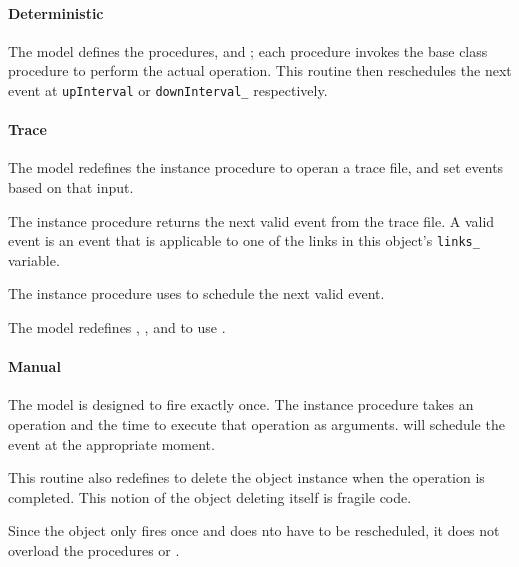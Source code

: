 \paragraph{Deterministic}
The model defines the procedures,  and ;
each procedure invokes the base class procedure to perform the actual operation.
This routine then reschedules the next event at
{\tt upInterval} or {\tt downInterval\_} respectively.

\paragraph{Trace}
The model redefines the instance procedure
to operan a trace file, and set events based on that input.

The instance procedure
returns the next valid event from the trace file.
A valid event is an event that is applicable to one of the links 
in this object's {\tt links\_} variable.

The instance procedure
uses 
to schedule the next valid event.

The model redefines
,
, and
to use .

\paragraph{Manual}
The model is designed to fire exactly once.
The instance procedure
takes an operation and the time to execute that operation as arguments.
will schedule the event at the appropriate moment.

This routine also redefines
to delete the object instance when the operation is completed.
This notion of the object deleting itself is fragile code.

Since the object only fires once and does nto have to be rescheduled,
it does not overload the procedures  or .

